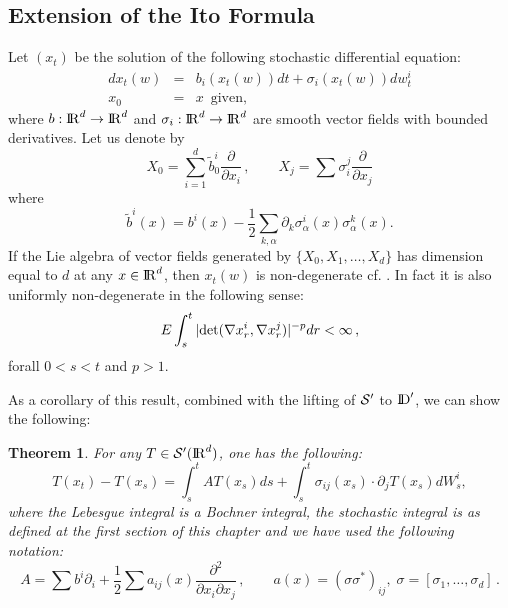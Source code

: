 \documentclass[12pt,a4paper]{book}
\newtheorem{theorem}{Theorem}[section]
\newcommand{\beaa}{\begin{eqnarray*}}
\newcommand{\eeaa}{\end{eqnarray*}}
\newcommand{\DD}{{\rm I\!D}}
\newcommand{\calS}{{\cal S}}
\newcommand{\R}{{\rm I\!R}}
\begin{document}
\subsection{Extension of the Ito Formula}
Let $(x_t)$ be the solution of the following stochastic differential equation:
\beaa
dx_t(w)&=&b_i(x_t(w))dt+\sigma_i(x_t(w))dw_t^i\\
x_0&=&x \,{\mbox{ given}},
\eeaa
where $b:\R^d\to\R^d$ and $\sigma_i:\R^d\to\R^d$ are smooth vector fields
with bounded derivatives. Let us denote by
$$
X_0=\sum_{i=1}^d\tilde{b}_0^i\frac{\partial}{\partial x_i}\,,\qquad
X_j=\sum \sigma_i^j\frac{\partial}{\partial x_j}
$$
\noindent
where
$$
\tilde{b}^i(x)=b^i(x)-\frac{1}{2}
\sum_{k,\alpha}\partial_k\sigma_\alpha^i(x)\sigma_\alpha^k(x).
$$
 If the Lie algebra of vector fields generated by $\{X_0,X_1,\ldots,X_d\}$ has
dimension equal to $d$ at any $x\in\R^d$, then $x_t(w)$ is non-degenerate
 cf. \cite{W1}. In fact it is also uniformly non-degenerate in the following
sense:
$$
E\int_s^t|{\mbox{\rm det}}(\nabla x_r^i,\nabla x_r^j)|^{-p} dr<\infty\,,
$$
forall $ 0<s<t$ and $ p>1$.


As a corollary of this result, combined with the lifting of ${\calS}'$
to $\DD'$, we can show the following:
\begin{theorem}
For any $T\in{\calS}'(\R^d)$, one has the following:
$$
T(x_t)-T(x_s)=\int_s^t AT(x_s)ds+
    \int_s^t\sigma_{ij}(x_s)\cdot\partial_j T(x_s)dW_s^i,
$$
where the Lebesgue integral is a Bochner integral, the stochastic integral
is as defined at the first section of this chapter and we have used
the following notation:
$$
A=\sum b^i\partial_i+\frac{1}{2}\sum a_{ij}(x)
   \frac{\partial^2}{\partial x_i\partial x_j}\,,\qquad
a(x)=(\sigma\sigma^\ast)_{ij},\;\sigma=[\sigma_1,\ldots,\sigma_d]\,.
$$
\end{theorem}
\end{document}
